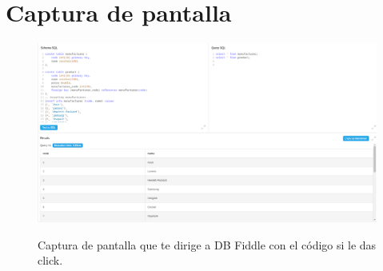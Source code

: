 \documentclass{article}
\begin{document}
\newpage %

\section*{Captura de pantalla}

\begin{figure}[ht]
    \centering
    \href{https://www.db-fiddle.com/f/nF3pqUTYuEuymCCpV78uN/1}{
        \includegraphics[width=\linewidth]{screenshot.png} %
    }
    \caption{Captura de pantalla que te dirige a DB Fiddle con el código si le das click.}
\end{figure}
\end{document}
